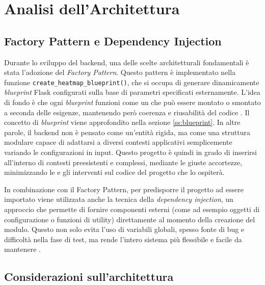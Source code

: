 \section{Analisi dell'Architettura}
\label{ch:backend-architecture}

\subsection{Factory Pattern e Dependency Injection}

Durante lo sviluppo del backend, una delle scelte architetturali fondamentali è stata l'adozione del \emph{Factory Pattern}. Questo pattern è implementato nella funzione \texttt{create\_heatmap\_blueprint()}, che si occupa di generare dinamicamente \textit{blueprint} Flask configurati sulla base di parametri specificati esternamente. L'idea di fondo è che ogni \textit{blueprint} funzioni come un  che può essere montato o smontato a seconda delle esigenze, mantenendo però coerenza e riusabilità del codice \cite{app-factories}. Il concetto di \textit{blueprint} viene approfondito nella sezione \ref{ss:blueprint}. In altre parole, il backend non è pensato come un'entità rigida, ma come una struttura modulare capace di adattarsi a diversi contesti applicativi semplicemente variando le configurazioni in input. Questo progetto è quindi in grado di inserirsi all'interno di contesti preesistenti e complessi, mediante le giuste accortezze, minimizzando le  e gli interventi sul codice del progetto che lo ospiterà.

In combinazione con il Factory Pattern, per predisporre il progetto ad essere importato  viene utilizzata anche la tecnica della \emph{dependency injection}, un approccio che permette di fornire componenti esterni (come ad esempio oggetti di configurazione o funzioni di utility) direttamente al momento della creazione del modulo. Questo non solo evita l'uso di variabili globali, spesso fonte di bug e difficoltà nella fase di test, ma rende l'intero sistema più flessibile e facile da mantenere \cite{dependency-injection-wiki,flask-di}.









\subsection{Considerazioni sull'architettura}

